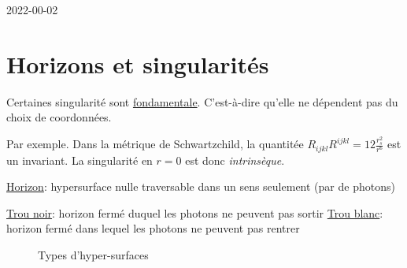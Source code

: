 


2022-00-02

\section*{Horizons et singularités}

Certaines singularité sont \underline{fondamentale}. C'est-à-dire qu'elle ne dépendent pas du choix de coordonnées.

Par exemple. Dans la métrique de Schwartzchild, la quantitée $R_{ijkl} R^{ijkl} = 12 \frac{r_s^{2}}{r^6} $ est un invariant. La singularité en $r=0$ est donc \textit{intrinsèque}.

\underline{Horizon}: hypersurface nulle traversable dans un sens seulement (par de photons)

\underline{Trou noir}: horizon fermé duquel les photons ne peuvent pas sortir 
\underline{Trou blanc}: horizon fermé dans lequel les photons ne peuvent pas rentrer

\begin{figure}[ht]
    \centering
    \caption{Types d'hyper-surfaces}
    \label{fig:types-d'hyper-surfaces}
\end{figure}




